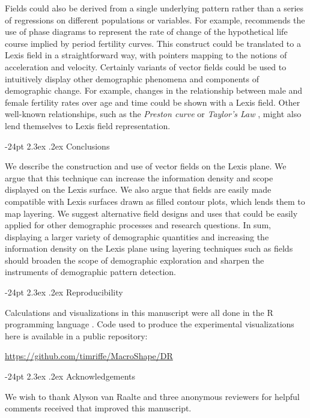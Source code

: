 \documentclass[10pt, twoside, parskip=half]{article}
\makeatletter
\renewcommand\section{\@startsection {section}{1}{\z@}%
                                   {-24pt}%
                                   {2.3ex \@plus.2ex}%
                                   {\normalfont\large\bfseries}}
\makeatother
\begin{document}
Fields could also be derived from a single underlying pattern rather than a series of regressions on different populations or variables. For example, \citet{shang2018visualizing} recommends the use of phase diagrams to represent the rate of change of the hypothetical life course implied by period fertility curves. This construct could be translated to a Lexis field in a straightforward way, with pointers mapping to the notions of acceleration and velocity. Certainly variants of vector fields could be used to intuitively display other demographic phenomena and components of demographic change. For example, changes in the relationship between male and female fertility rates over age and time could be shown with a Lexis field. Other well-known relationships, such as the \emph{Preston curve} \citep{preston1975changing} or \emph{Taylor's Law} \citep{cohen2018gompertz}, might also lend themselves to Lexis field representation.

\hypertarget{conclusions}{%
\section{Conclusions}\label{conclusions}}

We describe the construction and use of vector fields on the Lexis plane. We argue that this technique can increase the information density and scope displayed on the Lexis surface. We also argue that fields are easily made compatible with Lexis surfaces drawn as filled contour plots, which lends them to map layering. We suggest alternative field designs and uses that could be easily applied for other demographic processes and research questions. In sum, displaying a larger variety of demographic quantities and increasing the information density on the Lexis plane using layering techniques such as fields should broaden the scope of demographic exploration and sharpen the instruments of demographic pattern detection.

\hypertarget{reproducibility}{%
\section{Reproducibility}\label{reproducibility}}

Calculations and visualizations in this manuscript were all done in the R programming language \citep{R}. Code used to produce the experimental visualizations here is available in a public repository:

\url{https://github.com/timriffe/MacroShape/DR}

\hypertarget{acknowledgements}{%
\section{Acknowledgements}\label{acknowledgements}}

We wish to thank Alyson van Raalte and three anonymous reviewers for helpful comments received that improved this manuscript.

\clearpage

\newpage


\end{document}
